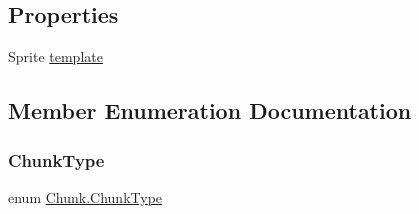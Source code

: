 \subsection*{Properties}
\begin{DoxyCompactItemize}
\item 
Sprite \mbox{\hyperlink{class_chunk_a90851ff2883364a1e00753d1fd35461b}{template}}
\end{DoxyCompactItemize}


\subsection{Member Enumeration Documentation}
\mbox{\label{class_chunk_ab2e9c44541a726c19e8f0afbcf82894c}} 
\subsubsection{\texorpdfstring{ChunkType}{ChunkType}}
{\footnotesize\ttfamily enum \mbox{\hyperlink{class_chunk_ab2e9c44541a726c19e8f0afbcf82894c}{Chunk.\+Chunk\+Type}}\hspace{0.3cm}{\ttfamily [strong]}}

